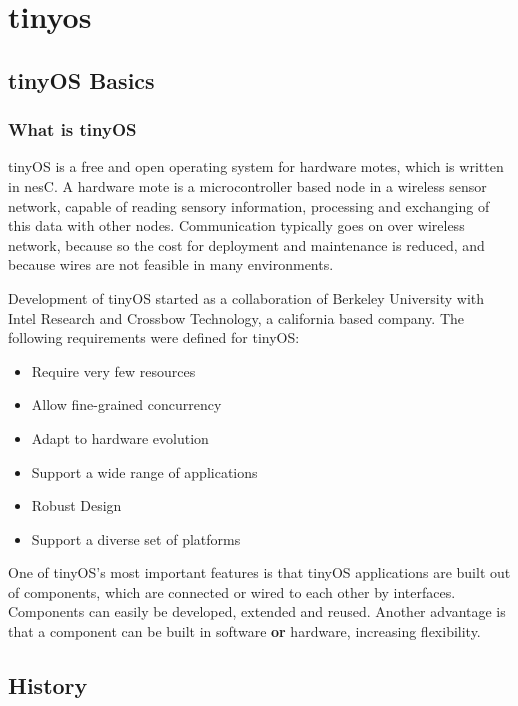 
\chapter{tinyos} \label{chapter:tinyos}

\section{tinyOS Basics}

\subsection{What is tinyOS}

tinyOS is a free and open operating system for hardware motes, which is written in nesC. A hardware mote is a microcontroller based node in a wireless sensor network, capable of reading sensory information, processing and exchanging of this data with other nodes. Communication typically goes on over wireless network, because so the cost for deployment and maintenance is reduced, and because wires are not feasible in many environments. 

Development of tinyOS started as a collaboration of Berkeley University with Intel Research and Crossbow Technology, a california based company.
The following requirements were defined for tinyOS:

\begin{itemize}
 \item Require very few resources
 \item Allow fine-grained concurrency
 \item Adapt to hardware evolution
 \item Support a wide range of applications
 \item Robust Design
 \item Support a diverse set of platforms
\end{itemize}

One of tinyOS's most important features is that tinyOS applications are built out of components, which are connected or wired to each other by interfaces. Components can easily be developed, extended and reused. Another advantage is that a component can be built in software \textbf{or} hardware, increasing flexibility. 

\section{History}

